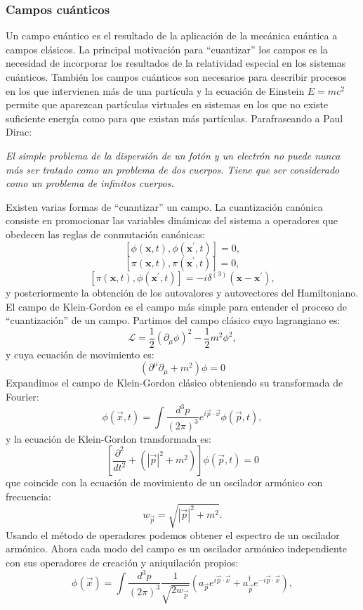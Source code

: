 \documentclass{article}
\theoremstyle{plain}
\theoremstyle{definition}
\begin{document}
	\subsubsection{Campos cuánticos}
	Un campo cuántico es el resultado de la aplicación de la mecánica cuántica a campos clásicos. La principal motivación para ``cuantizar'' los campos es la necesidad de incorporar los resultados de la relatividad especial en los sistemas cuánticos. También los campos cuánticos son necesarios para describir procesos en los que intervienen más de una partícula y la ecuación de Einstein \(E=mc^2\) permite que aparezcan partículas virtuales en sistemas en los que no existe suficiente energía como para que existan más partículas. Parafraseando a Paul Dirac: \begin{displayquote}{\textit{El simple problema de la dispersión de un fotón y un electrón no puede nunca más ser tratado como un problema de dos cuerpos. Tiene que ser considerado como un problema de infinitos cuerpos.}}\end{displayquote}\par
	Existen varias formas de ``cuantizar'' un campo. La cuantización canónica consiste en promocionar las variables dinámicas del sistema a  operadores que obedecen las reglas de conmutación canónicas: \[
	\left[\phi(\boldsymbol{x},t),\phi(\boldsymbol{x^{\prime}},t)\right] = 0,
	\]
	\[
	\left[\pi(\boldsymbol{x},t),\pi(\boldsymbol{x^{\prime}},t)\right] = 0,
	\]
	\[
	\left[\pi(\boldsymbol{x},t),\phi(\boldsymbol{x^{\prime}},t)\right] = -i\delta^{(3)}(\boldsymbol{x}-\boldsymbol{x^{\prime}}),
	\]
	y posteriormente la obtención de los autovalores y autovectores del Hamiltoniano.
	El campo de Klein-Gordon es el campo más simple para entender el proceso de ``cuantización'' de un campo.
	Partimos del campo clásico cuyo lagrangiano es:
	\[
	\mathcal{L}=\frac{1}{2}\left(\partial_{\mu}\phi\right)^2 -\frac{1}{2}m^2\phi^2,
	\]
	y cuya ecuación de movimiento es: \[
	\left(\partial^{\mu}\partial_{\mu}+m^2\right)\phi = 0
	\]
	Expandimos el campo de Klein-Gordon clásico obteniendo su transformada de Fourier: \[
	\phi(\vec{x},t) = \int\frac{d^3p}{(2\pi)^3}e^{i\vec{p}\cdot\vec{x}}\phi(\vec{p},t),
	\]
	y la ecuación de Klein-Gordon transformada es: \[
	\left[\frac{\partial^2}{dt^2}+\left(|\vec{p}|^2+m^2\right)\right]\phi(\vec{p},t) = 0
	\]
	que coincide con la ecuación de movimiento de un oscilador armónico con frecuencia:\[
	w_{\vec{p}}=\sqrt{|\vec{p}|^2+m^2}\text{.}
	\]
	Usando el método de operadores podemos obtener el espectro de un oscilador armónico. Ahora cada modo del campo es un oscilador armónico independiente con sus operadores de creación y aniquilación propios:\[
	\phi(\vec{x})=\int\frac{d^3p}{(2\pi)^3}\frac{1}{\sqrt{2w_{\vec{p}}}}\left(a_{\vec{p}}e^{i\vec{p}\cdot\vec{x}}+a^\dagger_{\vec{p}}e^{-i\vec{p}\cdot\vec{x}}\right),
	\]
\end{document}
